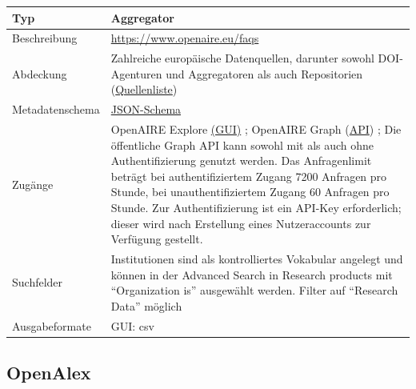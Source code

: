 \documentclass[
  ngerman,
  letterpaper,
  DIV=11]{scrreprt}
\newcounter{none} %
\begin{document}
{\def\LTcaptype{none} %
\begin{longtable}[]{@{}
  >{\raggedright\arraybackslash}p{}
  >{\raggedright\arraybackslash}p{}@{}}
\toprule\noalign{}
\begin{minipage}[b]{\linewidth}\raggedright
Typ
\end{minipage} & \begin{minipage}[b]{\linewidth}\raggedright
Aggregator
\end{minipage} \\
\midrule\noalign{}
\endhead
\bottomrule\noalign{}
\endlastfoot
Beschreibung & \url{https://www.openaire.eu/faqs} \\
Abdeckung & Zahlreiche europäische Datenquellen, darunter sowohl
DOI-Agenturen und Aggregatoren als auch Repositorien
(\href{https://explore.openaire.eu/search/find/dataproviders}{Quellenliste}) \\
Metadatenschema &
\href{https://doi.org/10.5281/zenodo.4238938}{JSON-Schema} \\
Zugänge & OpenAIRE Explore \href{https://explore.openaire.eu/}{(GUI)} ;
OpenAIRE Graph
(\href{https://graph.openaire.eu/docs/apis/graph-api/}{API}) ; Die
öffentliche Graph API kann sowohl mit als auch ohne Authentifizierung
genutzt werden. Das Anfragenlimit beträgt bei authentifiziertem Zugang
7200 Anfragen pro Stunde, bei unauthentifiziertem Zugang 60 Anfragen pro
Stunde. Zur Authentifizierung ist ein API-Key erforderlich; dieser wird
nach Erstellung eines Nutzeraccounts zur Verfügung gestellt. \\
Suchfelder & Institutionen sind als kontrolliertes Vokabular angelegt
und können in der Advanced Search in Research products mit
``Organization is'' ausgewählt werden. Filter auf ``Research Data''
möglich \\
Ausgabeformate & GUI: csv \\
\end{longtable}
}

\subsection{OpenAlex}\label{openalex}
\end{document}
